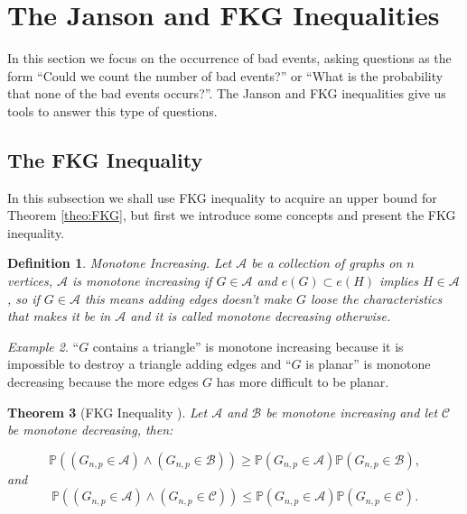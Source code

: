 \documentclass[12pt,twoside,a4paper]{book}
\numberwithin{equation}{section}
\newtheorem{theorem}             {Theorem}[section]
\newtheorem{definition}	[theorem] {Definition}
\theoremstyle{remark}
\newtheorem{example}	[theorem] {Example}
\begin{document}
\section{The Janson and FKG Inequalities}

In this section we focus on the occurrence of  bad events, asking questions as the form ``Could we count the number of bad events?'' or ``What is the probability that none of the bad events occurs?''. The Janson and FKG inequalities give us tools to answer this type of questions.

\subsection{The FKG Inequality}
In this subsection we shall use FKG inequality to acquire an upper bound for Theorem \ref{theo:FKG}, but first we introduce some concepts and present the FKG inequality.

\begin{definition}
Monotone Increasing. Let $\mathcal{A}$ be a collection of graphs on $n$ vertices, $\mathcal{A}$ is monotone increasing if $G \in \mathcal{A}$ and $e(G) \subset e(H)$ implies $H \in \mathcal{A}$, so if $G \in \mathcal{A}$ this means adding edges doesn't make $G$ loose the characteristics that makes it be in $\mathcal{A}$ and it is called monotone decreasing otherwise.     
\end{definition}

\begin{example}
``$G$ contains a triangle'' is monotone increasing because it is impossible to destroy a triangle adding edges and ``$G$ is planar'' is monotone decreasing because the more edges $G$ has more difficult to be planar.
\end{example}

\begin{theorem} [{FKG Inequality \cite{FKG71}}]
 Let $\mathcal{A}$ and $\mathcal{B}$ be monotone increasing and let $\mathcal{C}$ be monotone decreasing, then:

$$ \mathbb{P}((G_{n,p} \in \mathcal{A}) \wedge (G_{n,p} \in \mathcal{B})) \geq \mathbb{P}(G_{n,p} \in \mathcal{A})\mathbb{P}(G_{n,p} \in \mathcal{B}),$$
and
$$ \mathbb{P}((G_{n,p} \in \mathcal{A}) \wedge (G_{n,p} \in \mathcal{C})) \leq \mathbb{P}(G_{n,p} \in \mathcal{A})\mathbb{P}(G_{n,p} \in \mathcal{C}).$$
\end{theorem}
\end{document}
